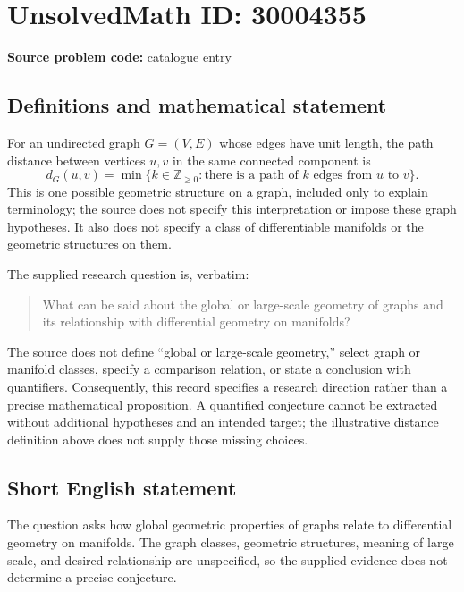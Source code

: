 \documentclass[11pt]{article}
\newcommand{\Z}{\mathbb{Z}}
\begin{document}
\section*{UnsolvedMath ID: 30004355}
\textbf{Source problem code:} catalogue entry
\subsection{Definitions and mathematical statement}
For an undirected graph \(G=(V,E)\) whose edges have unit length, the path distance between vertices \(u,v\) in the same connected component is
\[
 d_G(u,v)=\min\{k\in\Z_{\geq 0}:\text{there is a path of }k\text{ edges from }u\text{ to }v\}.
\]
This is one possible geometric structure on a graph, included only to explain terminology; the source does not specify this interpretation or impose these graph hypotheses. It also does not specify a class of differentiable manifolds or the geometric structures on them.

The supplied research question is, verbatim:
\begin{quote}
What can be said about the global or large-scale geometry of graphs and its relationship with differential geometry on manifolds?
\end{quote}
The source does not define ``global or large-scale geometry,'' select graph or manifold classes, specify a comparison relation, or state a conclusion with quantifiers. Consequently, this record specifies a research direction rather than a precise mathematical proposition. A quantified conjecture cannot be extracted without additional hypotheses and an intended target; the illustrative distance definition above does not supply those missing choices.
\subsection{Short English statement}
The question asks how global geometric properties of graphs relate to differential geometry on manifolds. The graph classes, geometric structures, meaning of large scale, and desired relationship are unspecified, so the supplied evidence does not determine a precise conjecture.
\end{document}
